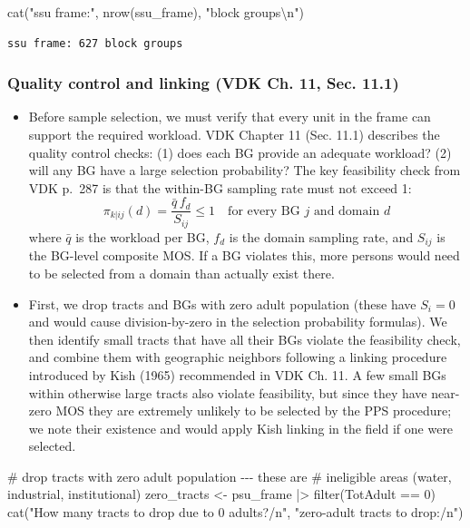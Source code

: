 \documentclass[
  11pt,
]{article}
\newenvironment{Shaded}{\begin{snugshade}}{\end{snugshade}}
\newcommand{\CommentTok}[1]{\textcolor[rgb]{0.37,0.37,0.37}{#1}}
\newcommand{\DecValTok}[1]{\textcolor[rgb]{0.68,0.00,0.00}{#1}}
\newcommand{\FunctionTok}[1]{\textcolor[rgb]{0.28,0.35,0.67}{#1}}
\newcommand{\NormalTok}[1]{\textcolor[rgb]{0.00,0.23,0.31}{#1}}
\newcommand{\OtherTok}[1]{\textcolor[rgb]{0.00,0.23,0.31}{#1}}
\newcommand{\SpecialCharTok}[1]{\textcolor[rgb]{0.37,0.37,0.37}{#1}}
\newcommand{\StringTok}[1]{\textcolor[rgb]{0.13,0.47,0.30}{#1}}
\begin{document}
\begin{Shaded}
\begin{Highlighting}[]
\FunctionTok{cat}\NormalTok{(}\StringTok{"ssu frame:"}\NormalTok{, }\FunctionTok{nrow}\NormalTok{(ssu\_frame), }\StringTok{"block groups}\SpecialCharTok{\textbackslash{}n}\StringTok{"}\NormalTok{)}
\end{Highlighting}
\end{Shaded}

\begin{verbatim}
ssu frame: 627 block groups
\end{verbatim}

\subsubsection{Quality control and linking (VDK Ch. 11, Sec.
11.1)}\label{quality-control-and-linking-vdk-ch.-11-sec.-11.1}

\begin{itemize}
\item
  Before sample selection, we must verify that every unit in the frame
  can support the required workload. VDK Chapter 11 (Sec. 11.1)
  describes the quality control checks: (1) does each BG provide an
  adequate workload? (2) will any BG have a large selection probability?
  The key feasibility check from VDK p.~287 is that the within-BG
  sampling rate must not exceed 1:
  \[\pi_{k|ij}(d) = \frac{\bar{q} \, f_d}{S_{ij}} \leq 1 \quad \text{for every BG } j \text{ and domain } d\]
  where \(\bar{q}\) is the workload per BG, \(f_d\) is the domain
  sampling rate, and \(S_{ij}\) is the BG-level composite MOS. If a BG
  violates this, more persons would need to be selected from a domain
  than actually exist there.
\item
  First, we drop tracts and BGs with zero adult population (these have
  \(S_i = 0\) and would cause division-by-zero in the selection
  probability formulas). We then identify small tracts that have all
  their BGs violate the feasibility check, and combine them with
  geographic neighbors following a linking procedure introduced by Kish
  (1965) recommended in VDK Ch. 11. A few small BGs within otherwise
  large tracts also violate feasibility, but since they have near-zero
  MOS they are extremely unlikely to be selected by the PPS procedure;
  we note their existence and would apply Kish linking in the field if
  one were selected.
\end{itemize}

\begin{Shaded}
\begin{Highlighting}[]
\CommentTok{\# drop tracts with zero adult population {-}{-}{-} these are}
\CommentTok{\# ineligible areas (water, industrial, institutional)}
\NormalTok{zero\_tracts }\OtherTok{\textless{}{-}}\NormalTok{ psu\_frame }\SpecialCharTok{|\textgreater{}} \FunctionTok{filter}\NormalTok{(TotAdult }\SpecialCharTok{==} \DecValTok{0}\NormalTok{)}
\FunctionTok{cat}\NormalTok{(}\StringTok{"How many tracts to drop due to 0 adults?/n"}\NormalTok{, }
    \StringTok{"zero{-}adult tracts to drop:/n"}\NormalTok{)}
\end{Highlighting}
\end{Shaded}
\end{document}
